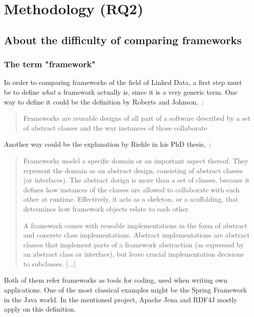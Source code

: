 \chapter{Methodology (RQ2)}\label{chap:methodology}
\section{About the difficulty of comparing frameworks}\label{def:framework}

\subsection{The term "framework"}

In order to comparing frameworks of the field of Linked Data, a first step must be to define \emph{what} a framework actually is, since it is a very generic term. One way to define it could be the definition by Roberts and Johnson,~\cite{roberts1996evolving}:

\begin{quotation}
Frameworks are reusable designs of all part of a software described by a set of abstract classes and the way instances of those collaborate
\end{quotation}

Another way could be the explanation by Riehle in his PhD thesis,~\cite{riehle2000framework}:

\begin{quotation}
Frameworks model a specific domain or an important aspect thereof. They represent the domain as an abstract design, consisting of abstract classes (or interfaces). The abstract design is more than a set of classes, because it defines how instances of the classes are allowed to collaborate with each other at runtime. Effectively, it acts as a skeleton, or a scaffolding, that determines how framework objects relate to each other.

A framework comes with reusable implementations in the form of abstract and concrete class implementations. Abstract implementations are abstract classes that implement parts of a framework abstraction (as expressed by an abstract class or interface), but leave crucial implementation decisions to subclasses. [...]
\end{quotation}

Both of them refer frameworks as tools for coding, used when writing own applications. One of the most classical examples might be the Spring Framework in the Java world. In the mentioned project, Apache Jena and RDF4J mostly apply on this definition.

